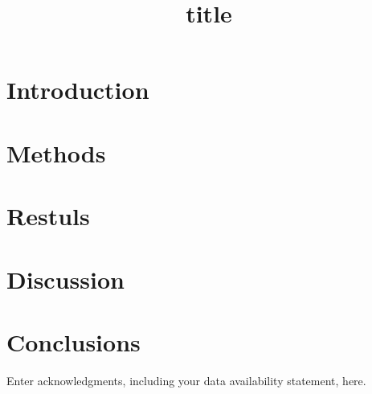 \documentclass{ametsoc}
\title{title}
\affiliation{here1}
\begin{document}
\maketitle

\section{Introduction}

\section{Methods}

\section{Restuls}

\section{Discussion}

\section{Conclusions}

\acknowledgments
Enter acknowledgments, including your data availability statement, here.








\end{document}
